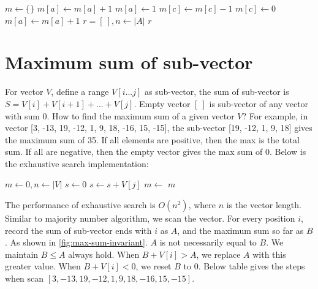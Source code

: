 \documentclass[b5paper]{article}
\begin{document}
\begin{Answer}[ref = {ex:majority-problem}]
{\begin{algorithmic}[1]
\State $m \gets \{\}$
    \State $m[a] \gets m[a] + 1$
    \State $m[a] \gets 1$
  \Else
      \State $m[c] \gets m[c] - 1$
        \State {}
      \EndIf
    \EndFor
  \EndIf
\EndFor
{}
  \State $m[c] \gets 0$
\EndFor
{} 
    \State $m[a] \gets m[a] + 1$
  \EndIf
\EndFor
\State $r = [\ ], n \gets |A|$
    \State {}
  \EndIf
\EndFor
\State \Return $r$
\EndFunction
\end{algorithmic}
}
\end{Answer}

\section{Maximum sum of sub-vector}

For vector $V$, define a range $V[i...j]$ as sub-vector, the sum of sub-vector is $S = V[i] + V[i+1] + ... + V[j]$. Empty vector $[\ ]$ is sub-vector of any vector with sum 0. How to find the maximum sum of a given vector $V$\cite{Bentley}? For example, in vector [3, -13, 19, -12, 1, 9, 18, -16, 15, -15], the sub-vector [19, -12, 1, 9, 18] gives the maximum sum of 35. If all elements are positive, then the max is the total sum. If all are negative, then the empty vector gives the max sum of 0. Below is the exhaustive search implementation:

\begin{algorithmic}[1]
  \State $m \gets 0, n \gets |V|$
    \State $s \gets 0$
      \State $s \gets s + V[j]$
      \State $m \gets $ 
    \EndFor
  \EndFor
  \State \Return $m$
\EndFunction
\end{algorithmic}

The performance of exhaustive search is $O(n^2)$, where $n$ is the vector length. Similar to majority number algorithm, we scan the vector. For every position $i$, record the sum of sub-vector ends with $i$ as $A$, and the maximum sum so far as $B$. As shown in \cref{fig:max-sum-invariant}. $A$ is not necessarily equal to $B$. We maintain $B \leq A$ always hold. When $B + V[i] > A$, we replace $A$ with this greater value. When $B + V[i] < 0$, we reset $B$ to 0. Below table gives the steps when scan $[3, -13, 19, -12, 1, 9, 18, -16, 15, -15]$.
\end{document}
